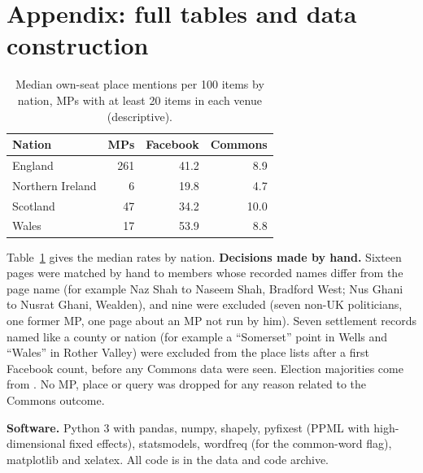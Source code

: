 \documentclass[11pt,a4paper]{article}
\begin{document}
\appendix
\section{Appendix: full tables and data construction}
\begin{table}[htbp]\centering\small\caption{Median own-seat place mentions per 100 items by nation, MPs with at least 20 items in each venue (descriptive).}\label{tab:appx}\begin{tabular}{lrrr}\toprule Nation & MPs & Facebook & Commons\\\midrule
England & 261 & 41.2 & 8.9\\
Northern Ireland & 6 & 19.8 & 4.7\\
Scotland & 47 & 34.2 & 10.0\\
Wales & 17 & 53.9 & 8.8\\
\bottomrule\end{tabular}\end{table}

Table~\ref{tab:appx} gives the median rates by nation. \textbf{Decisions made by hand.} Sixteen pages were matched by hand to members whose recorded names differ from the page name (for example Naz Shah to Naseem Shah, Bradford West; Nus Ghani to Nusrat Ghani, Wealden), and nine were excluded (seven non-UK politicians, one former MP, one page about an MP not run by him). Seven settlement records named like a county or nation (for example a ``Somerset'' point in Wells and ``Wales'' in Rother Valley) were excluded from the place lists after a first Facebook count, before any Commons data were seen. Election majorities come from \citet{hotham2026b}. No MP, place or query was dropped for any reason related to the Commons outcome.

\textbf{Software.} Python 3 with pandas, numpy, shapely, pyfixest (PPML with high-dimensional fixed effects), statsmodels, wordfreq (for the common-word flag), matplotlib and xelatex. All code is in the data and code archive.
\end{document}
